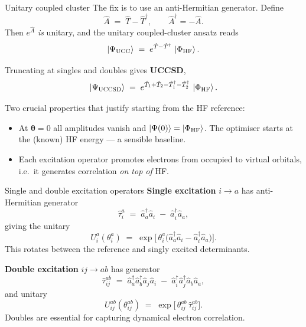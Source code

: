 \documentclass[10pt,aspectratio=169]{beamer}
\begin{document}
\begin{frame}{Unitary coupled cluster}
The fix is to use an anti-Hermitian generator. Define
\[
\hat A \;=\; \hat T - \hat T^\dagger,
\qquad \hat A^\dagger = -\hat A.
\]
Then $e^{\hat A}$ \emph{is} unitary, and the unitary coupled-cluster ansatz reads
\[
\ket{\Psi_{\mathrm{UCC}}}
\;=\; e^{\hat T - \hat T^\dagger}\,\ket{\Phi_{\mathrm{HF}}}.
\]

Truncating at singles and doubles gives \textbf{UCCSD},
\[
\ket{\Psi_{\mathrm{UCCSD}}}
\;=\; e^{\hat T_1 + \hat T_2 - \hat T_1^\dagger - \hat T_2^\dagger}\,\ket{\Phi_{\mathrm{HF}}}.
\]

\bigskip
Two crucial properties that justify starting from the HF reference:
\begin{itemize}
  \item At $\bm\theta=0$ all amplitudes vanish and $\ket{\Psi(0)}=\ket{\Phi_{\mathrm{HF}}}$.
        The optimiser starts at the (known) HF energy --- a sensible baseline.
  \item Each excitation operator promotes electrons from occupied to virtual orbitals,
        i.e.\ it generates correlation \emph{on top of} HF.
\end{itemize}
\end{frame}

\begin{frame}{Single and double excitation operators}
\textbf{Single excitation} $i\to a$ has anti-Hermitian generator
\[
\hat\tau_i^{a} \;=\; \hat a_a^\dagger \hat a_i \;-\; \hat a_i^\dagger \hat a_a,
\]
giving the unitary
\[
U_i^{a}(\theta_i^a) \;=\; \exp\!\big[\,\theta_i^a\big(\hat a_a^\dagger \hat a_i - \hat a_i^\dagger \hat a_a\big)\big].
\]
This rotates between the reference and singly excited determinants.

\bigskip
\textbf{Double excitation} $ij\to ab$ has generator
\[
\hat\tau_{ij}^{ab}
\;=\;
\hat a_a^\dagger \hat a_b^\dagger \hat a_j \hat a_i
\;-\;
\hat a_i^\dagger \hat a_j^\dagger \hat a_b \hat a_a,
\]
and unitary
\[
U_{ij}^{ab}(\theta_{ij}^{ab})
\;=\;
\exp\!\big[\,\theta_{ij}^{ab}\,\hat\tau_{ij}^{ab}\big].
\]
Doubles are essential for capturing dynamical electron correlation.
\end{frame}
\end{document}

